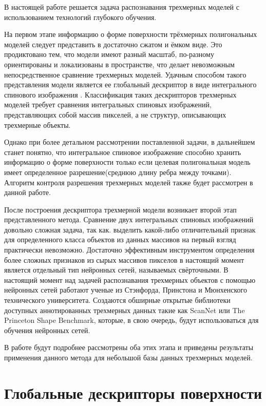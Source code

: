 \documentclass[14pt]{article}
\numberwithin{figure}{section}
\numberwithin{equation}{section}
\begin{document}
В настоящей работе решается задача распознавания трехмерных моделей с использованием технологий глубокого обучения.

На первом этапе информацию о форме поверхности трёхмерных полигональных моделей следует представить в достаточно сжатом и ёмком виде. Это продиктовано тем, что модели имеют разный масштаб, по-разному ориентированы и локализованы в пространстве, что делает невозможным непосредственное сравнение трехмерных моделей. Удачным способом такого представления модели является ее глобальный дескриптор в виде интегрального спинового изображения \cite{KCh}. Классификация таких дескрипторов трехмерных моделей требует сравнения интегральных спиновых изображений, представляющих собой массив пикселей, а не структур, описывающих трехмерные объекты.

Однако при более детальном рассмотрении поставленной задачи, в дальнейшем станет понятно, что интегральное спиновое изображение способно хранить информацию о форме поверхности только если целевая полигональная модель имеет определенное разрешение(среднюю длину ребра между точками). Алгоритм контроля разрешения трехмерных моделей также будет рассмотрен в данной работе.

После построения дескриптора трехмерной модели возникает второй этап представленного метода. Сравнение двух интегральных спиновых изображений довольно сложная задача, так как. выделить какой-либо отличительный признак для определенного класса объектов из данных массивов на первый взгляд практически невозможно. Достаточно эффективным инструментом определения более сложных признаков из сырых массивов пикселов в настоящий момент является отдельный тип нейронных сетей, называемых свёрточными. %
В настоящий момент над задачей распознавания трехмерных объектов с помощью нейронных сетей работают ученые из Стэнфорда, Принстона и Мюнхенского технического университета. Создаются обширные открытые библиотеки доступных аннотированных трехмерных данных такие как ScanNet или The Princeton Shape Benchmark, которые, в свою очередь, будут использоваться для обучения нейронных сетей.%

В работе будут подробнее рассмотрены оба этих этапа и приведены результаты применения данного метода для небольшой базы данных трехмерных моделей.

\section{Глобальные дескрипторы поверхности}
\end{document}
